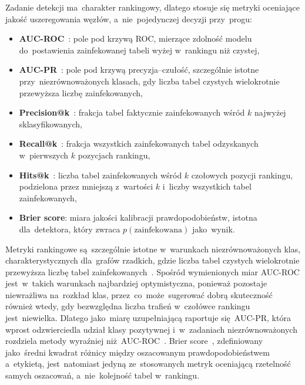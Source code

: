 \documentclass[polish,master,a4paper,oneside]{ppfcmthesis}
\renewcommand{\_}{\origtextunderscore\ifmmode\else\allowbreak\fi}
\begin{document}
Zadanie detekcji ma~charakter rankingowy, dlatego stosuje się metryki
oceniające jakość uszeregowania węzłów, a~nie~pojedynczej decyzji przy~progu:

\begin{itemize}
  \item \textbf{AUC-ROC}~\cite{Fawcett2006}: pole pod krzywą ROC, mierzące
        zdolność modelu do~postawienia zainfekowanej tabeli wyżej w~rankingu
        niż czystej,
  \item \textbf{AUC-PR}~\cite{Davis2006}: pole pod krzywą precyzja–czułość,
        szczególnie istotne przy~niezrównoważonych klasach, gdy liczba tabel
        czystych wielokrotnie przewyższa liczbę zainfekowanych,
  \item \textbf{Precision@k}~\cite{Manning2008}: frakcja tabel faktycznie
        zainfekowanych wśród $k$ najwyżej sklasyfikowanych,
  \item \textbf{Recall@k}~\cite{Manning2008}: frakcja wszystkich zainfekowanych
        tabel odzyskanych w~pierwszych $k$ pozycjach rankingu,
  \item \textbf{Hits@k}~\cite{Dutkiewicz2026}: liczba tabel zainfekowanych
        wśród $k$ czołowych pozycji rankingu, podzielona przez mniejszą
        z~wartości $k$ i~liczby wszystkich tabel zainfekowanych,
  \item \textbf{Brier score}: miara jakości kalibracji prawdopodobieństw,
        istotna dla~detektora, który zwraca $p(\text{zainfekowana})$
        jako~wynik.
\end{itemize}

Metryki rankingowe są~szczególnie istotne w~warunkach niezrównoważonych klas,
charakterystycznych dla~grafów rzadkich, gdzie liczba tabel czystych
wielokrotnie przewyższa liczbę tabel zainfekowanych~\cite{Boinski2025,KohanMarzagao2025}.
Spośród wymienionych miar AUC-ROC jest~w~takich warunkach najbardziej
optymistyczna, ponieważ pozostaje niewrażliwa na~rozkład klas, przez~co~może~sugerować
dobrą skuteczność również wtedy, gdy bezwzględna liczba trafień w~czołówce
rankingu jest~niewielka. Dlatego jako~miarę uzupełniającą raportuje się~AUC-PR,
która wprost odzwierciedla udział klasy pozytywnej i~w~zadaniach
niezrównoważonych rozdziela metody wyraźniej niż~AUC-ROC~\cite{Davis2006,Saito2015}.
Brier score~\cite{Brier1950}, zdefiniowany jako~średni kwadrat różnicy między
oszacowanym prawdopodobieństwem a~etykietą, jest~natomiast jedyną
ze~stosowanych metryk oceniającą rzetelność samych oszacowań, a~nie~kolejność
tabel w~rankingu.
\end{document}
